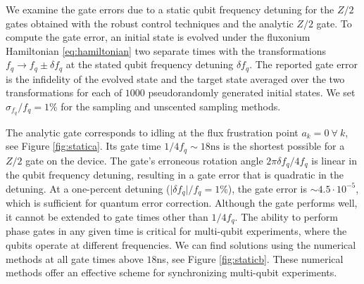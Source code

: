 We examine the gate errors due to a static qubit frequency
detuning for the $Z/2$ gates obtained with the robust control techniques
and the analytic $Z/2$ gate.
To compute the gate error,
an initial state is evolved
under the fluxonium Hamiltonian \eqref{eq:hamiltonian}
two separate times with the transformations
$f_{q} \rightarrow f_{q} \pm \delta f_{q}$
at the stated qubit frequency detuning $\delta f_{q}$.
The reported gate error is the infidelity of
the evolved state and the target state averaged over
the two transformations for each of $1000$ pseudorandomly
generated initial states.
We set $\sigma_{f_{q}}/f_{q} = 1\%$
for the sampling and unscented sampling
methods.

The analytic gate corresponds to
idling at the flux frustration point $a_{k} = 0 \ \forall \ k$, see Figure
\ref{fig:statica}. Its gate time $1 / 4 f_{q} \sim 18\textrm{ns}$
is the shortest possible for a $Z/2$ gate on the device.
The gate's erroneous rotation angle
$2 \pi \delta f_{q} / 4 f_{q}$ is linear in the
qubit frequency detuning, resulting in a gate error that is quadratic
in the detuning.
At a one-percent
detuning ($\lvert \delta f_{q} \rvert / f_{q} = 1\%$),
the gate error is $\sim 4.5 \cdot 10^{-5}$,
which is sufficient for quantum error correction.
Although the gate performs well, it cannot be extended
to gate times other than
$1 / 4 f_{q}$. The ability to perform
phase gates in any given time is critical
for multi-qubit experiments, where the qubits operate at different
frequencies.
We can find solutions using the numerical methods at
all gate times above $18$ns, see Figure \ref{fig:staticb}.
These numerical methods offer an effective scheme for synchronizing
multi-qubit experiments.

